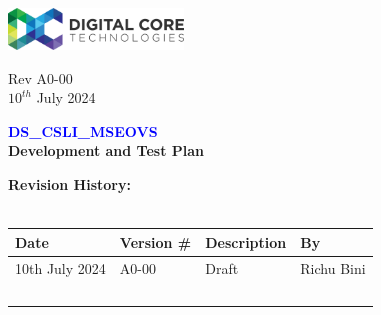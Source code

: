 \documentclass[a4paper,12pt]{article}
\begin{document}
	
	\begin{titlepage}
		\begin{flushleft} %
		\includegraphics[trim= 0cm 0cm 0cm 0.2cm, clip, width=0.35\textwidth]{dct-logo}\quad %
			\begin{minipage}[b]{0.6\textwidth} %
				\raggedleft %
				\normalsize %
				Rev A0-00 \quad \\
				$10^{th}$ July 2024 \
			\end{minipage}
		\end{flushleft}
		
		
		\vspace{6cm} %
		\begin{center} %
			\Huge %
			\textcolor{blue}{\textbf{DS\_CSLI\_MSEOVS}}\\
			\textbf{Development and Test Plan}
		\end{center}
		
	\end{titlepage}
	
	\newpage
	
	
	\textbf{Revision History:} \\
	\\
	\begin{tabular}{|l|l|l|l|}
		\hline
		Date & Version \# & Description & By \\
		\hline
		10th July 2024 & A0-00 & Draft & Richu Bini \\
		\hline
		& \  & \ & \  \\
		\hline
	\end{tabular}
	\newpage
	\tableofcontents
\end{document}
